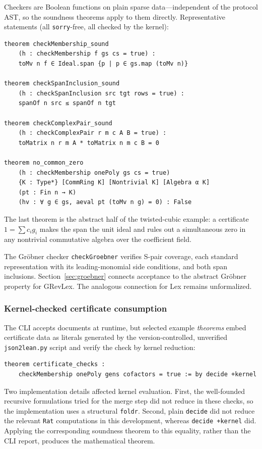 \documentclass[11pt]{article}
\newcommand{\code}[1]{\texttt{#1}}
\begin{document}
Checkers are Boolean functions on plain sparse data---independent of
the protocol AST, so the soundness theorems apply to them directly.
Representative statements (all \code{sorry}-free, all checked by the
kernel):

\begin{lstlisting}[style=leanstyle]
theorem checkMembership_sound
    (h : checkMembership f gs cs = true) :
    toMv n f ∈ Ideal.span {p | p ∈ gs.map (toMv n)}

theorem checkSpanInclusion_sound
    (h : checkSpanInclusion src tgt rows = true) :
    spanOf n src ≤ spanOf n tgt

theorem checkComplexPair_sound
    (h : checkComplexPair r m c A B = true) :
    toMatrix n r m A * toMatrix n m c B = 0

theorem no_common_zero
    (h : checkMembership onePoly gs cs = true)
    {K : Type*} [CommRing K] [Nontrivial K] [Algebra α K]
    (pt : Fin n → K)
    (hv : ∀ g ∈ gs, aeval pt (toMv n g) = 0) : False
\end{lstlisting}

The last theorem is the abstract half of the twisted-cubic example: a
certificate $1=\sum c_i g_i$ makes the span the unit ideal and rules
out a simultaneous zero in any nontrivial commutative algebra over the
coefficient field.

The Gr\"obner checker \code{checkGroebner} verifies S-pair coverage,
each standard representation with its leading-monomial side
conditions, and both span inclusions.  Section~\ref{sec:groebner}
connects acceptance to the abstract Gr\"obner property for GRevLex.
The analogous connection for Lex remains unformalized.

\subsubsection{Kernel-checked certificate consumption}

The CLI accepts documents at runtime, but selected example
\emph{theorems} embed certificate data as literals generated by the
version-controlled, unverified \code{json2lean.py} script and verify
the check by kernel reduction:
\begin{lstlisting}[style=leanstyle]
theorem certificate_checks :
    checkMembership onePoly gens cofactors = true := by decide +kernel
\end{lstlisting}
Two implementation details affected kernel evaluation.  First, the
well-founded recursive formulations tried for the merge step did not
reduce in these checks, so the implementation uses a structural
\code{foldr}.  Second, plain \code{decide} did not reduce the relevant
\code{Rat} computations in this development, whereas
\code{decide +kernel} did.
Applying the corresponding soundness theorem to this equality, rather
than the CLI report, produces the mathematical theorem.
\end{document}
